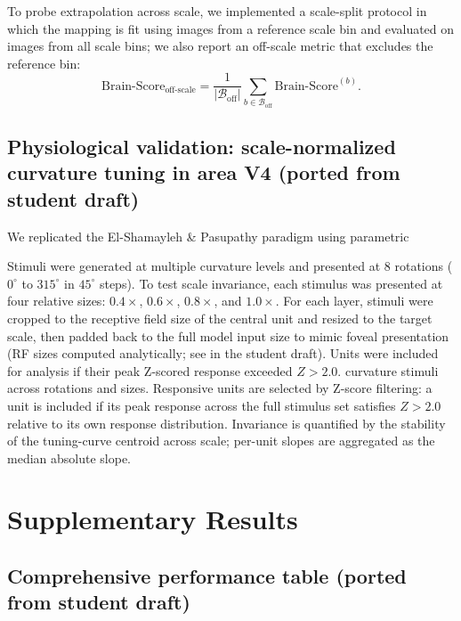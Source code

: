 \documentclass[pdflatex,sn-nature]{sn-jnl}
\begin{document}
To probe extrapolation across scale, we implemented a scale-split protocol in which the mapping is
fit using images from a reference scale bin and evaluated on images from all scale bins; we also
report an off-scale metric that excludes the reference bin:
\begin{equation}
\text{Brain-Score}_{\text{off-scale}} =
\frac{1}{|\mathcal{B}_{\text{off}}|}\sum_{b \in \mathcal{B}_{\text{off}}}\text{Brain-Score}^{(b)}.
\label{eq:offscale-brainscore}
\end{equation}

\subsection{Physiological validation: scale-normalized curvature tuning in area V4 (ported from student draft)}

We replicated the El-Shamayleh \& Pasupathy paradigm \cite{ElShamayleh2016Curvature} using parametric

Stimuli were generated at multiple curvature levels and presented at 8 rotations ($0^\circ$ to $315^\circ$ in $45^\circ$ steps).
To test scale invariance, each stimulus was presented at four relative sizes: $0.4\times$, $0.6\times$, $0.8\times$, and $1.0\times$.
For each layer, stimuli were cropped to the receptive field size of the central unit and resized to the target scale, then padded back
to the full model input size to mimic foveal presentation (RF sizes computed analytically; see \cite{araujo2019computing} in the student draft).
Units were included for analysis if their peak Z-scored response exceeded $Z>2.0$.
curvature stimuli across rotations and sizes. Responsive units are selected by Z-score filtering:
a unit is included if its peak response across the full stimulus set satisfies $Z>2.0$ relative to
its own response distribution. Invariance is quantified by the stability of the tuning-curve centroid
across scale; per-unit slopes are aggregated as the median absolute slope.

\section{Supplementary Results}

\subsection{Comprehensive performance table (ported from student draft)}
\end{document}
